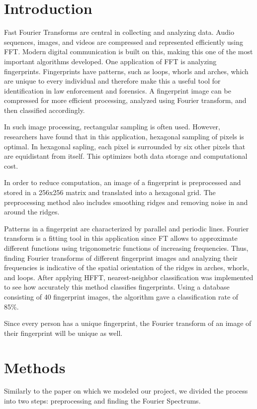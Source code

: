\documentclass[letter]{amsart}
\begin{document}
\section*{Introduction}
Fast Fourier Transforms are central in collecting and analyzing data. Audio sequences, images, and videos are compressed and represented efficiently using FFT. Modern digital communication is built on this, making this one of the most important algorithms developed. One application of FFT is analyzing fingerprints. Fingerprints have patterns, such as loops, whorls and arches, which are unique to every individual and therefore make this a useful tool for identification in law enforcement and forensics. A fingerprint image can be compressed for more efficient processing, analyzed using Fourier transform, and then classified accordingly.

In such image processing, rectangular sampling is often used. However, researchers have found that in this application, hexagonal sampling of pixels is optimal. In hexagonal sapling, each pixel is surrounded by six other pixels that are equidistant from itself. This optimizes both data storage and computational cost.

In order to reduce computation, an image of a fingerprint is preprocessed and stored in a 256x256 matrix and translated into a hexagonal grid. The preprocessing method also includes smoothing ridges and removing noise in and around the ridges.

Patterns in a fingerprint are characterized by parallel and periodic lines. Fourier transform is a fitting tool in this application since FT allows to approximate different functions using trigonometric functions of increasing frequencies. Thus, finding Fourier transforms of different fingerprint images and analyzing their frequencies is indicative of the spatial orientation of the ridges in arches, whorls, and loops. After applying HFFT,  nearest-neighbor classification was implemented to see how accurately this method classifies fingerprints. Using a database consisting of 40 fingerprint images, the algorithm gave a classification rate of 85\%.

Since every person has a unique fingerprint, the Fourier transform of an image of their fingerprint will be unique as well. 


\section*{Methods}
Similarly to the paper on which we modeled our project, we divided the process into two steps: preprocessing and finding the Fourier Spectrums.
\end{document}
